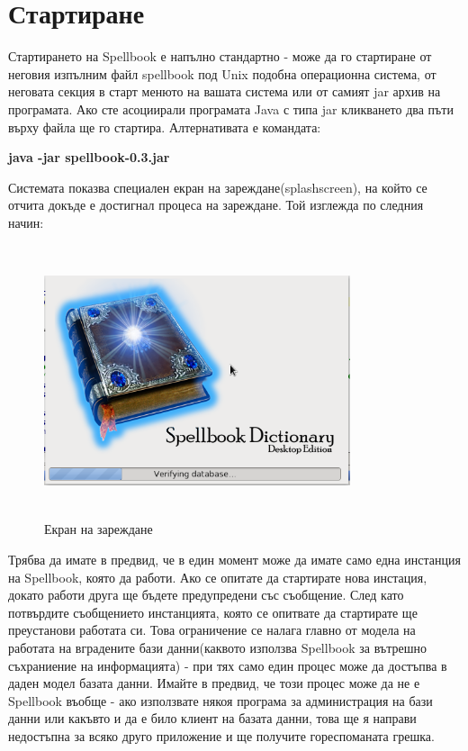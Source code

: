 \section{Стартиране}
Стартирането на Spellbook е напълно стандартно - може да го стартиране
от неговия изпълним файл spellbook под Unix подобна операционна
система, от неговата секция в старт менюто на вашата система или от
самият jar архив на програмата. Ако сте асоциирали програмата Java с
типа jar кликването два пъти върху файла ще го стартира. Алтернативата
е командата:

\textbf{java -jar spellbook-0.3.jar}

Системата показва специален екран на зареждане(splashscreen), на който
се отчита докъде е достигнал процеса на зареждане. Той изглежда по
следния начин:

\begin{figure}[htbp]
  \caption{Екран на зареждане}
  \centering
  \includegraphics[width=90mm, height=80mm]{images/splashscreen.png}
\end{figure}

Трябва да имате в предвид, че в един момент може да имате само една
инстанция на Spellbook, която да работи. Ако се опитате да стартирате
нова инстация, докато работи друга ще бъдете предупредени със
съобщение. След като потвърдите съобщението инстанцията, която се
опитвате да стартирате ще преустанови работата си. Това ограничение се
налага главно от модела на работата на вградените бази данни(каквото
използва Spellbook за вътрешно съхраниение на информацията) - при тях
само един процес може да достъпва в даден модел базата данни. Имайте в
предвид, че този процес може да не е Spellbook въобще - ако използвате
някоя програма за администрация на бази данни или какъвто и да е било
клиент на базата данни, това ще я направи недостъпна за всяко друго
приложение и ще получите гореспоманата грешка.

